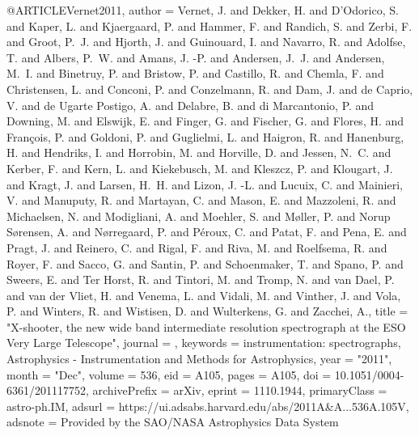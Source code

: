 \documentclass{aa}
\begin{document}
{{{{{{{{{{{{{{@ARTICLE{Vernet2011,
       author = {{Vernet}, J. and {Dekker}, H. and {D'Odorico}, S. and {Kaper}, L. and
         {Kjaergaard}, P. and {Hammer}, F. and {Randich}, S. and {Zerbi}, F. and
         {Groot}, P.~J. and {Hjorth}, J. and {Guinouard}, I. and {Navarro}, R. and
         {Adolfse}, T. and {Albers}, P.~W. and {Amans}, J. -P. and
         {Andersen}, J.~J. and {Andersen}, M.~I. and {Binetruy}, P. and
         {Bristow}, P. and {Castillo}, R. and {Chemla}, F. and
         {Christensen}, L. and {Conconi}, P. and {Conzelmann}, R. and {Dam}, J. and
         {de Caprio}, V. and {de Ugarte Postigo}, A. and {Delabre}, B. and
         {di Marcantonio}, P. and {Downing}, M. and {Elswijk}, E. and
         {Finger}, G. and {Fischer}, G. and {Flores}, H. and
         {Fran{\c{c}}ois}, P. and {Goldoni}, P. and {Guglielmi}, L. and
         {Haigron}, R. and {Hanenburg}, H. and {Hendriks}, I. and
         {Horrobin}, M. and {Horville}, D. and {Jessen}, N.~C. and {Kerber}, F. and
         {Kern}, L. and {Kiekebusch}, M. and {Kleszcz}, P. and {Klougart}, J. and
         {Kragt}, J. and {Larsen}, H.~H. and {Lizon}, J. -L. and {Lucuix}, C. and
         {Mainieri}, V. and {Manuputy}, R. and {Martayan}, C. and {Mason}, E. and
         {Mazzoleni}, R. and {Michaelsen}, N. and {Modigliani}, A. and
         {Moehler}, S. and {M{\o}ller}, P. and {Norup S{\o}rensen}, A. and
         {N{\o}rregaard}, P. and {P{\'e}roux}, C. and {Patat}, F. and
         {Pena}, E. and {Pragt}, J. and {Reinero}, C. and {Rigal}, F. and
         {Riva}, M. and {Roelfsema}, R. and {Royer}, F. and {Sacco}, G. and
         {Santin}, P. and {Schoenmaker}, T. and {Spano}, P. and {Sweers}, E. and
         {Ter Horst}, R. and {Tintori}, M. and {Tromp}, N. and {van Dael}, P. and
         {van der Vliet}, H. and {Venema}, L. and {Vidali}, M. and
         {Vinther}, J. and {Vola}, P. and {Winters}, R. and {Wistisen}, D. and
         {Wulterkens}, G. and {Zacchei}, A.},
        title = "{X-shooter, the new wide band intermediate resolution spectrograph at the ESO Very Large Telescope}",
      journal = {\aap},
     keywords = {instrumentation: spectrographs, Astrophysics - Instrumentation and Methods for Astrophysics},
         year = "2011",
        month = "Dec",
       volume = {536},
          eid = {A105},
        pages = {A105},
          doi = {10.1051/0004-6361/201117752},
archivePrefix = {arXiv},
       eprint = {1110.1944},
 primaryClass = {astro-ph.IM},
       adsurl = {https://ui.adsabs.harvard.edu/abs/2011A&A...536A.105V},
      adsnote = {Provided by the SAO/NASA Astrophysics Data System}
}

}}}}}}}}}}}}}}
\end{document}

